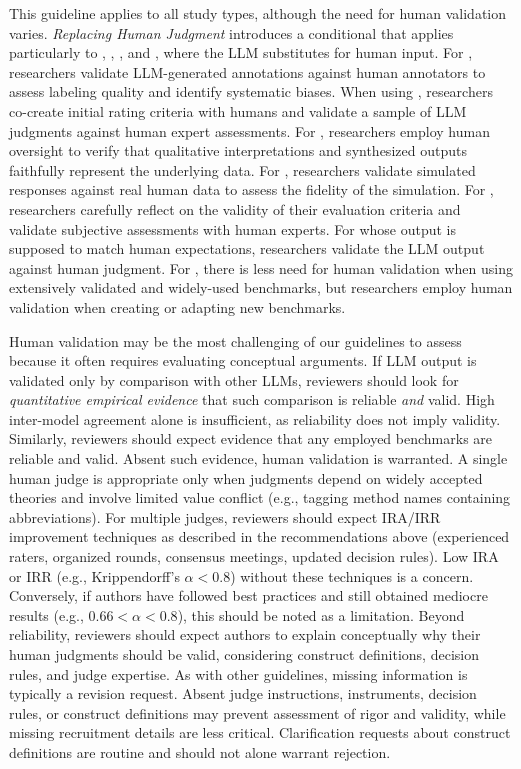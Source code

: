 
This guideline applies to all study types, although the need for human validation varies. \emph{Replacing Human Judgment} introduces a conditional \must that applies particularly to \annotators, \judges, \synthesis, and \subjects, where the LLM substitutes for human input.
For \annotators, researchers \should validate LLM-generated annotations against human annotators to assess labeling quality and identify systematic biases.
When using \judges, researchers \should co-create initial rating criteria with humans and validate a sample of LLM judgments against human expert assessments.
For \synthesis, researchers \should employ human oversight to verify that qualitative interpretations and synthesized outputs faithfully represent the underlying data.
For \subjects, researchers \should validate simulated responses against real human data to assess the fidelity of the simulation.
For \llmusage, researchers \should carefully reflect on the validity of their evaluation criteria and validate subjective assessments with human experts.
For \newtools whose output is supposed to match human expectations, researchers \should validate the LLM output against human judgment.
For \benchmarkingtasks, there is less need for human validation when using extensively validated and widely-used benchmarks, but researchers \should employ human validation when creating or adapting new benchmarks.


Human validation may be the most challenging of our guidelines to assess because it often requires evaluating conceptual arguments. If LLM output is validated only by comparison with other LLMs, reviewers should look for \textit{quantitative empirical evidence} that such comparison is reliable \textit{and} valid. High inter-model agreement alone is insufficient, as reliability does not imply validity. Similarly, reviewers should expect evidence that any employed benchmarks are reliable and valid. Absent such evidence, human validation is warranted.
A single human judge is appropriate only when judgments depend on widely accepted theories and involve limited value conflict (e.g., tagging method names containing abbreviations). For multiple judges, reviewers should expect IRA/IRR improvement techniques as described in the recommendations above (experienced raters, organized rounds, consensus meetings, updated decision rules). Low IRA or IRR (e.g., Krippendorff's $\alpha<0.8$) without these techniques is a concern. Conversely, if authors have followed best practices and still obtained mediocre results (e.g., $0.66<\alpha<0.8$), this should be noted as a limitation.
Beyond reliability, reviewers should expect authors to explain conceptually why their human judgments should be valid, considering construct definitions, decision rules, and judge expertise.
As with other guidelines, missing information is typically a revision request. Absent judge instructions, instruments, decision rules, or construct definitions may prevent assessment of rigor and validity, while missing recruitment details are less critical. Clarification requests about construct definitions are routine and should not alone warrant rejection.

